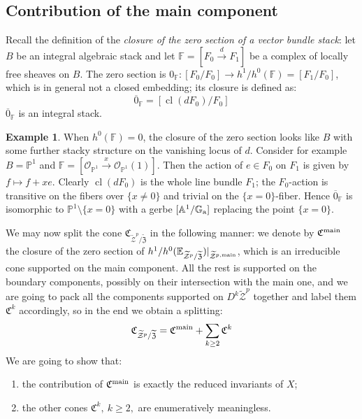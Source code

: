 \documentclass[11pt]{amsart}
\newcommand{\pazocal}{\mathcal}
\newcommand{\tZ}{\widetilde{\pazocal Z}}
\newcommand{\tZp}{\widetilde{\pazocal Z}^p}
\newcommand{\tXP}{\widetilde{\mathfrak Z}}
\newcommand{\PP}{\mathbb P}
\newcommand{\OO}{\mathcal{O}}
\renewcommand{\to}{\rightarrow}
\newcommand{\Aaff}{\mathbb{A}}
\theoremstyle{definition}
\theoremstyle{definition}
\newtheorem{ex}[thm]{Example}
\begin{document}
\subsection{Contribution of the main component}
Recall the definition of the \emph{closure of the zero section of a vector bundle stack}: let $B$ be an integral algebraic stack and let $\mathbb F=[F_0\xrightarrow{d} F_1]$ be a complex of locally free sheaves on $B$. The zero section is $0_{\mathbb F}\colon [F_0/F_0]\to h^1/h^0(\mathbb F)=[F_1/F_0]$, which is in general not a closed embedding; its closure is defined as:
\[ \overline{0}_{\mathbb F}=[\operatorname{cl}(dF_0)/F_0] \]
$\overline{0}_{\mathbb F}$ is an integral stack.

\begin{ex}
When $h^0(\mathbb F)=0$, the closure of the zero section looks like $B$ with some further stacky structure on the vanishing locus of $d$. Consider for example $B=\PP^1$ and $\mathbb F=[\OO_{\PP^1}\xrightarrow{x}\OO_{\PP^1}(1)]$. Then the action of $e\in F_0$ on $F_1$ is given by $f\mapsto f+xe$. Clearly $\operatorname{cl}(dF_0)$ is the whole line bundle $F_1$; the $F_0$-action is transitive on the fibers over $\{x\neq 0\}$ and trivial on the $\{x=0\}$-fiber. Hence $\overline{0}_{\mathbb F}$ is isomorphic to $\PP^1\setminus\{x=0\}$ with a gerbe $[\Aaff^1/\mathbb G_{\rm a}]$ replacing the point $\{x=0\}$.
\end{ex}

We may now split the cone $\mathfrak{C}_{\tZp/\tXP}$ in the following manner: we denote by $\mathfrak C^{\rm{main}}$ the closure of the zero section of $h^1/h^0(\mathbb {E}_{\tZp/\tXP})\rvert_{\tZ^{p,\rm{main}}}$, which is an irreducible cone supported on the main component. All the rest is supported on the boundary components, possibly on their intersection with the main one, and we are going to pack all the components supported on $D^k\tZp$ together and label them $\mathfrak C^k$ accordingly, so in the end we obtain a splitting:
\[
 \mathfrak{C}_{\tZp/\tXP}=\mathfrak C^{\rm{main}}+\sum_{k\geq 2} \mathfrak C^k
\]
We are going to show that:
\begin{enumerate}
 \item the contribution of $\mathfrak C^{\rm{main}}$ is exactly the reduced invariants of $X$;
 \item the other cones $\mathfrak C^k,\ k\geq 2,$ are enumeratively meaningless.
\end{enumerate}
\end{document}
